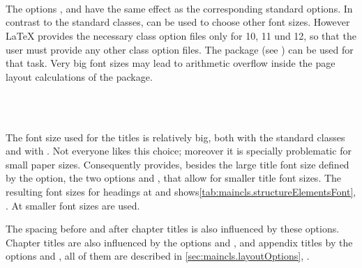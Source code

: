 \begin{Declaration}
  \Option{10pt}\\%
  \Option{11pt}\\%
  \Option{12pt}\\
\end{Declaration}%
%
%
%
%
The options \Option{10pt}, \Option{11pt} and \Option{12pt} have the
same effect as the corresponding standard options. In contrast to the
standard classes, {\KOMAScript} can be used to choose other font
sizes. However {\LaTeX} provides the
necessary class option files only for 10, 11 und
12, so that the user must provide any other class option
files. The package  (see
\cite{package:extsizes}) can be used for that
task. Very big font sizes may lead to arithmetic overflow inside the
page layout calculations of the  package.
%
%
%
%
%


\begin{Declaration}
  \\
  \\
\end{Declaration}%
%
%
%
The font size used for the titles is
relatively big, both with the standard classes and with {\KOMAScript}. Not
everyone likes this choice; moreover it is specially problematic for small
paper sizes. Consequently {\KOMAScript} provides, besides the large title font
size defined by the  option, the two options
 and , that allow for smaller
title font sizes. The resulting font sizes for headings at  and
 shows\autoref{tab:maincls.structureElementsFont},
. At  smaller
font sizes are used.

The spacing before and
after chapter titles is also influenced by these options. Chapter
titles are also influenced by the options  and
, and appendix titles by the options
 and , all of them
are described in \autoref{sec:maincls.layoutOptions},
.
%
%
%
%


